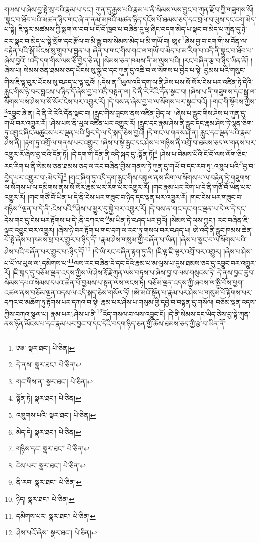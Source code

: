 གཡས་པ་ཞེས་བྱ་སྟེ་སྲ་བའི་རྣམ་པ་དང་། ཀུན་དུ་རྒྱས་པའི་རྣམ་པ་ནི་སེམས་ལས་བྱུང་བ་ཀུན་རྫོབ་ཀྱི་གཟུགས་སོ། །སྣང་བ་ཐོབ་པའི་མཚན་ཉིད་གང་ཞེ་ན་ནམ་མཁའི་མཚན་ཉིད་དངོས་པོ་ཐམས་ཅད་དང་བྲལ་བ་ལུས་དང་ངག་མེད་པ་སྟེ། ཇི་ལྟར་མཚམས་ཀྱི་སྨག་ལ་བབ་པ་ངོ་བོ་ཁྱབ་པ་བཞིན་དུ་ཕྲ་ཞིང་བདག་མེད་པ་སྣང་བ་མེད་པ་ཀུན་དུ་ཉེ་བར་སྣང་བ་མེད་པ་སྟེ་སྲོག་དང་རྩོལ་བ་མི་རྒྱུ་བས་སེམས་མེད་པ་མི་གཡོ་བ། ཨཱཿ་\footnote{ཨཿ་  སྣར་ཐང་།  པེ་ཅིན། }ཞེས་བྱ་བ་ངག་གི་ས་བོན་ལ་བརྟེན་པའི་སྒོ་ཡོངས་སུ་གྲུབ་པ་བླུན་པ། ཞེན་པ་གང་གིས་གང་ལ་གཡོ་བ་མེད་པ་མ་རིག་པ་འདི་ནི་སྣང་བ་ཐོབ་པ་ཞེས་བྱའོ། །འདི་དག་གིས་ལས་ཅི་བྱེད་ཅེ་ན། །སེམས་ཅན་ཁམས་ནི་མ་ལུས་པའི། །རང་བཞིན་རྩ་བ་ཉིད་ཡིན་ནོ། །ཞེས་པ། སེམས་ཅན་ཐམས་ཅད་ཡོངས་སུ་སྐྱེ་བ་དང་ཀུན་དུ་འཆི་བ་ལ་སོགས་པ་བྱེད་པ་སྟེ། བྱམས་པའི་གསུང་གིས་ཇི་ལྟ་བུར་ཡོངས་སུ་བཤད་པ་ལྟ་བུའོ། །:དེས་ན་\footnote{དེ་ནས་  སྣར་ཐང་།  པེ་ཅིན། }ཡུལ་འདི་དག་ལ་ནི་ཤེས་པས་སོ་སོར་ངེས་པར་འཛིན་ཏེ་དེའི་རླུང་གིས་ཉེ་བར་བླངས་པ་ཉིད་དོ་ཞེས་བྱ་བ་འདི་བསྟན་ལ། དེ་ནི་རེ་རེའི་དོན་སྣང་བ། །ཞེས་པ་ནི་གཟུགས་དང་སྒྲ་ལ་སོགས་པས་ཤེས་པ་སོ་སོར་ངེས་པར་འགྱུར་རོ། །དེ་བས་ན་ཞེས་བྱ་བ་ལ་སོགས་པར་སྣང་བའོ། །:གང་གི་སྟོབས་ཀྱིས་\footnote{གང་གིས་ན་  སྣར་ཐང་།  པེ་ཅིན། }འབྱུང་ཞེ་ན། དེ་ནི་རེ་རེའི་དོན་སྣང་བ། །རླུང་གིས་བླངས་ནས་འཛིན་བྱེད་ལ། །ཞེས་པ་རླུང་གིས་ཤེས་པ་ཀུན་དུ་གཡོ་བར་འགྱུར་རོ། །ཤེས་པས་ནི་ཡུལ་འཛིན་པར་འགྱུར་རོ། །རླུང་དང་རྣམ་ཤེས་ནི་རླུང་དང་རྣམ་ཤེས་ཏེ་ལྷན་ཅིག་ཏུ་འབྱུང་ཞིང་མཚུངས་པར་ལྡན་པའི་ཕྱིར་དེ་ལ་དེ་སྐད་ཅེས་བྱའོ། །དེ་གང་ལ་གནས་ཤེ་ན། རླུང་དང་ལྡན་པའི་རྣམ་ཤེས་ནི། །རྟག་ཏུ་འགྲོ་ལ་གནས་པར་འགྱུར། །ཞེས་པ་སྟེ་རླུང་དང་ཤེས་པ་གཉིས་ནི་འགྲོ་བ་ཐམས་ཅད་ལ་གནས་པར་འགྱུར་རོ་ཞེས་བྱ་བའི་དོན་ཏོ། །དེ་དག་གི་དོན་ནི་འདི་སྐད་དུ་:སྟོན་ཏོ།\footnote{སྟོན་ཏེ།  སྣར་ཐང་།  པེ་ཅིན། } །ཤེས་པ་བེམས་པོའི་ངོ་བོ་ལས་ལོག་ཅིང་རང་རིག་པ་ནི་སེམས་ཅན་ཐམས་ཅད་ལ་རང་བཞིན་གྱིས་གནས་ཏེ་ཀུན་དུ་གཡོ་བ་དང་རབ་ཏུ་:འཁྲུལ་པའི་\footnote{འཁྲུགས་པའི་  སྣར་ཐང་།  པེ་ཅིན། }བྱ་བ་བྱེད་པར་འགྱུར་བ་:མེད་དོ།\footnote{མེད་དེ།  སྣར་ཐང་།  པེ་ཅིན། } །གང་ཞིག་ཏུ་འདི་དག་རླུང་གིས་བསྐུལ་ནས་མིག་ལ་སོགས་པ་ལ་བརྟེན་ཏེ་གཟུགས་ལ་སོགས་པ་ལ་དམིགས་ནས་སོ་སོར་རྣམ་པར་རིག་པར་འགྱུར་རོ། །གང་རྣམ་པར་རིག་པ་དེ་ནི་གཙོ་བོ་ཡིན་པར་འགྱུར་རོ། །གང་གཙོ་བོ་ཡིན་པ་དེ་ནི་ངེས་པར་གཟུང་བ་ཉིད་དང་ལྡན་པར་འགྱུར་རོ། །གང་ངེས་པར་གཟུང་བ་གཉིས་\footnote{གཉིས་དང་  སྣར་ཐང་།  པེ་ཅིན། }ལྡན་པ་དེ་ནི་:ངེས་པའི་\footnote{ངེས་པར་  སྣར་ཐང་།  པེ་ཅིན། }ཤེས་པ་མྱུར་དུ་སྐྱེ་བར་འགྱུར་རོ། །དེ་བས་ན་གང་དང་གང་ལྡན་པ་དེ་ལ་དེ་དང་དེས་གང་དུ་ངེས་པར་རྟོགས་པ་དེ་:ནི་དཀའ་བ་\footnote{ནི་རབ་  སྣར་ཐང་།  པེ་ཅིན། }མ་ཡིན་ཏེ་བཤད་པར་བྱའོ། །སེམས་དེ་ལས་ཀྱང་། རང་བཞིན་ཇི་ལྟར་འབྱུང་བར་འགྱུར། །ཞེས་ཉེ་བར་རྟོག་པ་གང་དག་ལ་རབ་ཏུ་གསལ་བར་བཤད་པ། ཨེ་འདི་ནི་རླུང་ཁམས་ཆེན་པོ་སྟེ་ཞེས་པ་ཁམས་ཕྲ་བར་གྱུར་པ་ཉིད་དོ། །རྣམ་ཤེས་གསུམ་གྱི་བཞོན་པ་ཡིན། །ཞེས་པ་སྣང་བ་ལ་སོགས་པའི་ཤེས་པའི་བཞོན་པར་གྱུར་པ་:ཉིད་དོ།\footnote{ཉིད།  སྣར་ཐང་།  པེ་ཅིན། } །དེ་ཡི་རང་བཞིན་རྟག་ཏུ་ནི། །ཇི་ལྟ་ཇི་ལྟར་འགྲོ་བར་འགྱུར། །ཞེས་པ་ཤེས་པ་པོ་ལ་ཡུལ་ལ་:དམིགས་པ་\footnote{དམིགས་པར་  སྣར་ཐང་།  པེ་ཅིན། }ལས་རང་བཞིན་དེ་དང་དེའི་རྣམ་པ་མ་ལུས་པ་དུས་ཐམས་ཅད་དུ་འབྱུང་བར་འགྱུར་རོ། །ཇི་སྐད་དུ་བཅོམ་ལྡན་འདས་ཀྱིས་ཡེ་ཤེས་རྡོ་རྗེ་ཀུན་ལས་བཏུས་པ་ཞེས་བྱ་བ་ལས་གསུངས་ཏེ། དེ་ནས་བྱང་ཆུབ་སེམས་དཔའ་སེམས་དཔའ་ཆེན་པོ་བྱམས་པ་སྟན་ལས་ལངས་ཏེ། བཅོམ་ལྡན་འདས་ཀྱི་ཞབས་ལ་སྤྱི་བོས་ཕྱག་འཚལ་ནས་བཅོམ་ལྡན་འདས་ལ་འདི་སྐད་ཅེས་གསོལ་ཏོ། །ཨེ་མའོ་སྟོན་པ་རྣམ་པར་ཤེས་པ་གསུམ་པོ་རྟོགས་པར་དཀའ་བ་མཆོག་ཏུ་རྟོགས་པར་དཀའ་བ་སྟེ། རྣམ་པར་ཤེས་པ་གསུམ་གྱི་དབྱེ་བ་བསྟན་དུ་གསོལ། བཅོམ་ལྡན་འདས་ཀྱིས་བཀའ་སྩལ་པ། རྣམ་པར་:ཤེས་པ་ནི་\footnote{ཤེས་པའོ་ཞེས་  སྣར་ཐང་།  པེ་ཅིན། }འོད་གསལ་བ་ལས་འབྱུང་ངོ། །དེ་ནི་སེམས་དང་ཡིད་ཅེས་བྱ་སྟེ་ཀུན་ནས་ཉོན་མོངས་པ་དང་རྣམ་པར་བྱང་བ་དང་དེའི་བདག་ཉིད་ཅན་གྱི་ཆོས་ཐམས་ཅད་ཀྱི་རྩ་བ་ཡིན་ནོ། 
